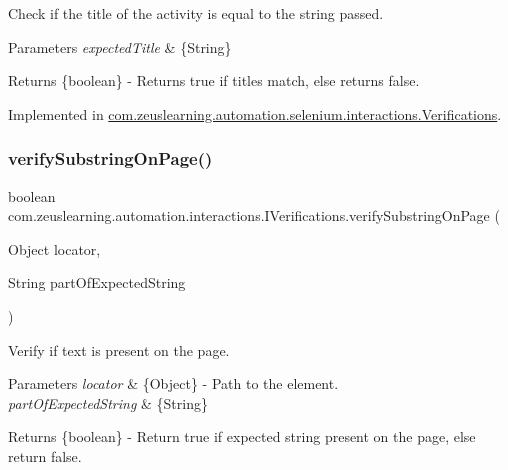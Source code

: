 Check if the title of the activity is equal to the string passed.


\begin{DoxyParams}{Parameters}
{\em expected\+Title} & \{String\} \\
\hline
\end{DoxyParams}
\begin{DoxyReturn}{Returns}
\{boolean\} -\/ Returns {\ttfamily true} if titles match, else returns {\ttfamily false}. 
\end{DoxyReturn}


Implemented in \hyperlink{classcom_1_1zeuslearning_1_1automation_1_1selenium_1_1interactions_1_1Verifications_ad9c55fe144291c194e182b1b2b213da5}{com.\+zeuslearning.\+automation.\+selenium.\+interactions.\+Verifications}.

\hypertarget{interfacecom_1_1zeuslearning_1_1automation_1_1interactions_1_1IVerifications_a0fa329dc2ffd80c2bb9afe685ef95bea}{}\label{interfacecom_1_1zeuslearning_1_1automation_1_1interactions_1_1IVerifications_a0fa329dc2ffd80c2bb9afe685ef95bea} 
\subsubsection{\texorpdfstring{verify\+Substring\+On\+Page()}{verifySubstringOnPage()}}
{\footnotesize\ttfamily boolean com.\+zeuslearning.\+automation.\+interactions.\+I\+Verifications.\+verify\+Substring\+On\+Page (\begin{DoxyParamCaption}\item[{Object}]{locator,  }\item[{String}]{part\+Of\+Expected\+String }\end{DoxyParamCaption})}

Verify if text is present on the page.


\begin{DoxyParams}{Parameters}
{\em locator} & \{Object\} -\/ Path to the element. \\
\hline
{\em part\+Of\+Expected\+String} & \{String\} \\
\hline
\end{DoxyParams}
\begin{DoxyReturn}{Returns}
\{boolean\} -\/ Return {\ttfamily true} if expected string present on the page, else return {\ttfamily false}. 
\end{DoxyReturn}


